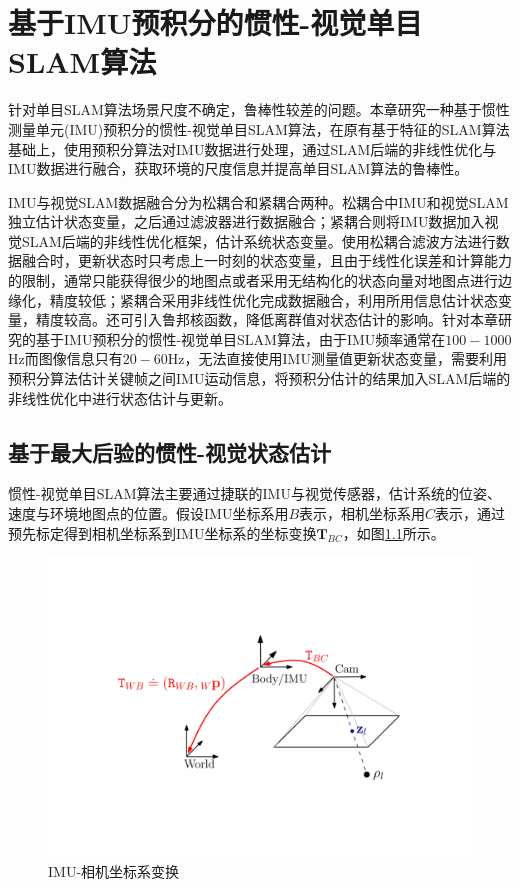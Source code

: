 
\chapter{基于IMU预积分的惯性-视觉单目SLAM算法}
\label{chap:VISLAM}
针对单目SLAM算法场景尺度不确定，鲁棒性较差的问题。本章研究一种基于惯性测量单元(IMU)预积分的惯性-视觉单目SLAM算法，在原有基于特征的SLAM算法基础上，使用预积分算法\upcite{[5.1]}对IMU数据进行处理，通过SLAM后端的非线性优化与IMU数据进行融合，获取环境的尺度信息并提高单目SLAM算法的鲁棒性。

IMU与视觉SLAM数据融合分为松耦合和紧耦合两种\upcite{[5.2]}。松耦合中IMU和视觉SLAM独立估计状态变量，之后通过滤波器进行数据融合；紧耦合则将IMU数据加入视觉SLAM后端的非线性优化框架，估计系统状态变量。使用松耦合滤波方法进行数据融合时，更新状态时只考虑上一时刻的状态变量，且由于线性化误差和计算能力的限制，通常只能获得很少的地图点或者采用无结构化的状态向量对地图点进行边缘化，精度较低；紧耦合采用非线性优化完成数据融合，利用所用信息估计状态变量，精度较高。还可引入鲁邦核函数，降低离群值对状态估计的影响。针对本章研究的基于IMU预积分的惯性-视觉单目SLAM算法，由于IMU频率通常在$100-1000$Hz而图像信息只有$20-60$Hz，无法直接使用IMU测量值更新状态变量，需要利用预积分算法估计关键帧之间IMU运动信息，将预积分估计的结果加入SLAM后端的非线性优化中进行状态估计与更新。


\section{基于最大后验的惯性-视觉状态估计}
惯性-视觉单目SLAM算法主要通过捷联的IMU与视觉传感器，估计系统的位姿、速度与环境地图点的位置。假设IMU坐标系用$B$表示，相机坐标系用$C$表示，通过预先标定得到相机坐标系到IMU坐标系的坐标变换$\boldsymbol{T}_{BC}$，如图\ref{fig5.1}所示。

\begin{figure}
\centering
\includegraphics[scale=0.35,angle=-90]{figures/Fig5-1.pdf}
\caption{IMU-相机坐标系变换}
\label{fig5.1}
\end{figure}

